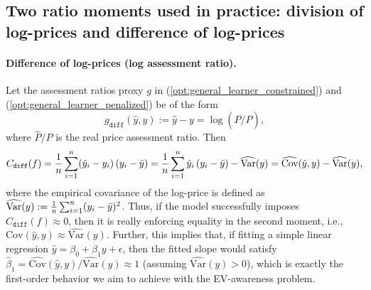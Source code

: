 \documentclass[11pt]{article}
\theoremstyle{plain}
\theoremstyle{definition}
\newcommand{\1}{\mathbf{1}}
\begin{document}
\subsection{Two ratio moments used in practice: division of log-prices and difference of log-prices}
\label{sec:diff_div}



\paragraph{Difference of log-prices (log assessment ratio).} 
Let the assessment ratios proxy $g$ in (\ref{opt:general_learner_constrained}) and (\ref{opt:general_learner_penalized}) be of the form
\begin{equation}
\label{eq:g_diff}
g_{\texttt{diff}}(\hat y,y):=\hat y-y=\log(\hat P/P),
\end{equation}
where $\hat{P}/P$ is the real price assessment ratio. 
Then 
\begin{equation}
\label{eq:cov_diff} 
C_{\texttt{diff}}(f)
=\frac{1}{n}\sum_{i=1}^n (\hat y_i-y_i)\,(y_i - \Bar{y})=
\frac{1}{n}\sum_{i=1}^n \hat y_i\,(y_i - \Bar{y}) - \widehat{\mathrm{Var}}(y)=\widehat{\text{Cov}}(\hat{y}, y) - \widehat{\mathrm{Var}}(y),
\end{equation}where the empirical covariance of the log-price is defined as $\widehat{\mathrm{Var}}(y):=\frac{1}{n}\sum_{i=1}^n (y_i - \Bar{y})^2$. Thus, if the model successfully imposes $C_{\texttt{diff}}(f)\approx 0$, then it is really enforcing equality in the second moment, i.e., $\text{Cov}(\hat{y}, y) \approx \widehat{\mathrm{Var}}(y)$. Further, this implies that, if fitting a simple linear regression $\hat{y} = \beta_0 + \beta_1 y + \epsilon$, then the fitted slope would satisfy $\hat \beta_1 =\widehat{\mathrm{Cov}}(\hat y,y)/\widehat{\mathrm{Var}}(y) \approx 1$ (assuming $\widehat{\mathrm{Var}}(y)>0$), which is exactly the first-order behavior we aim to achieve with the EV-awareness problem.
\end{document}
